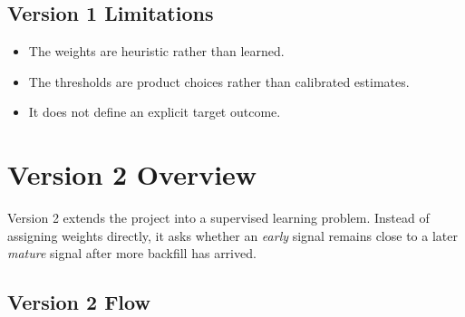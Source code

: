 \documentclass[11pt]{article}
\begin{document}
\subsection{Version 1 Limitations}

\begin{itemize}[leftmargin=1.5em]
    \item The weights are heuristic rather than learned.
    \item The thresholds are product choices rather than calibrated estimates.
    \item It does not define an explicit target outcome.
\end{itemize}

\section{Version 2 Overview}

Version 2 extends the project into a supervised learning problem. Instead of assigning weights directly, it asks whether an \emph{early} signal remains close to a later \emph{mature} signal after more backfill has arrived.

\subsection{Version 2 Flow}
\end{document}
